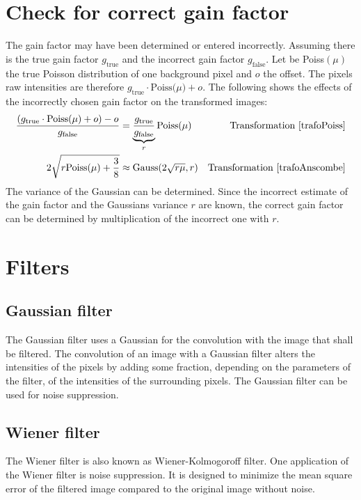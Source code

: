 \section{Check for correct gain factor} \label{checkGain}
The gain factor may have been determined or entered incorrectly. Assuming there is the true gain factor $g_\text{true}$ and the incorrect gain factor $g_\text{false}$. Let be Poiss$(\mu)$ the true Poisson distribution of one background pixel and $o$ the offset. The pixels raw intensities are therefore $g_\text{true} \cdot \text{Poiss($\mu$)} + o$. The following shows the effects of the incorrectly chosen gain factor on the transformed images:
\begin{align}
	\frac{(g_\text{true} \cdot \text{Poiss($\mu$)} + o)-o}{g_\text{false}} &= \underbrace{\frac{g_\text{true}}{g_\text{false}}}_{r}\text{Poiss($\mu$)}&\text{Transformation \ref{trafoPoiss}}\\
	2\sqrt{r\text{Poiss($\mu$)}+\frac{3}{8}}&\approx \text{Gauss}(2\sqrt{r\mu},r)&\text{Transformation \ref{trafoAnscombe}}
\end{align}
The variance of the Gaussian can be determined. Since the incorrect estimate of the gain factor and the Gaussians variance $r$ are known, the correct gain factor can be determined by multiplication of the incorrect one with $r$.

\section{Filters}
\subsection*{Gaussian filter}
The Gaussian filter uses a Gaussian for the convolution with the image that shall be filtered. The convolution of an image with a Gaussian filter alters the intensities of the pixels by adding some fraction, depending on the parameters of the filter, of the intensities of the surrounding pixels. The Gaussian filter can be used for noise suppression.
\subsection*{Wiener filter}
The Wiener filter is also known as Wiener-Kolmogoroff filter. One application of the Wiener filter is noise suppression. It is designed to minimize the mean square error of the filtered image compared to the original image without noise. 
